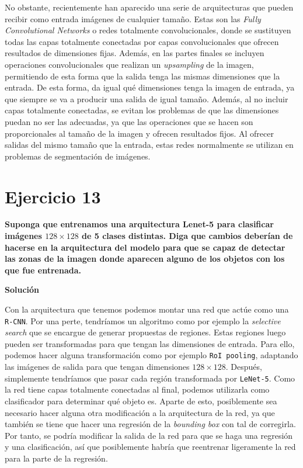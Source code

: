 \documentclass[11pt,a4paper]{article}
\newcommand{\answer}{\noindent\textbf{Solución}}
\newcommand{\question}[1]{\noindent\textbf{#1}}
\newcommand{\nonumsection}[1]{\section*{#1}\addcontentsline{toc}{section}{#1}}
\begin{document}
No obstante, recientemente han aparecido una serie de arquitecturas que pueden
recibir como entrada imágenes de cualquier tamaño. Estas son las \textit{Fully
Convolutional Networks} \cite{fcn} o redes totalmente convolucionales, donde se
sustituyen todas las capas totalmente conectadas por capas convolucionales que
ofrecen resultados de dimensiones fijas. Además,
en las partes finales se incluyen operaciones convolucionales que realizan un
\textit{upsampling} de la imagen, permitiendo de esta forma que la salida tenga las mismas
dimensiones que la entrada. De esta forma, da igual qué dimensiones tenga la imagen
de entrada, ya que siempre se va a producir una salida de igual tamaño.
Además, al no incluir capas totalmente conectadas, se evitan los problemas
de que las dimensiones puedan no ser las adecuadas, ya que las operaciones
que se hacen son proporcionales al tamaño de la imagen y ofrecen resultados
fijos. Al ofrecer salidas del mismo tamaño que la entrada, estas redes
normalmente se utilizan en problemas de segmentación de imágenes.

\nonumsection{Ejercicio 13}

\question{Suponga que entrenamos una arquitectura Lenet-5 para clasificar
imágenes $128 \times 128$ de 5 clases distintas. Diga que cambios deberían de
hacerse en la arquitectura del modelo para que se capaz de detectar
las zonas de la imagen donde aparecen alguno de los objetos con los
que fue entrenada.}

\answer

Con la arquitectura que tenemos podemos montar una red que actúe como una \texttt{R-CNN}.
Por una perte, tendríamos un algoritmo como por ejemplo la \textit{selective search}
que se encargue de generar propuestas de regiones. Estas regiones luego pueden ser
transformadas para que tengan las dimensiones de entrada. Para ello, podemos hacer
alguna transformación como por ejemplo \texttt{RoI pooling}, adaptando las
imágenes de salida para que tengan dimensiones $128 \times 128$. Después, simplemente
tendríamos que pasar cada región transformada por \texttt{LeNet-5}. Como la red
tiene capas totalmente conectadas al final, podemos utilizarla como clasificador
para determinar qué objeto es. Aparte de esto, posiblemente sea necesario hacer
alguna otra modificación a la arquitectura de la red, ya que también se tiene que
hacer una regresión de la \textit{bounding box} con tal de corregirla. Por tanto, se
podría modificar la salida de la red para que se haga una regresión y una clasificación,
así que posiblemente habría que reentrenar ligeramente la red para la parte de la regresión.
\end{document}
